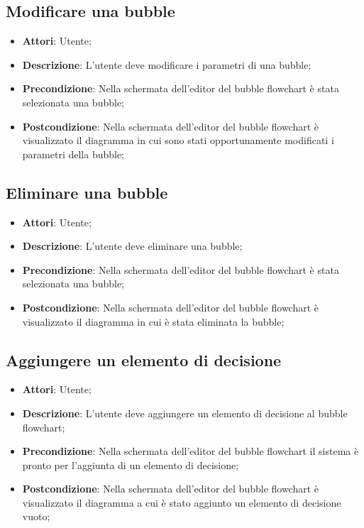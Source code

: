 \documentclass[../AnalisiDeiRequisiti.tex]{subfiles}
\begin{document}
	\subsection{Modificare una bubble}
	\begin{itemize}
		\item \textbf{Attori}: Utente;
		\item \textbf{Descrizione}: L'utente deve modificare i parametri di una bubble;
		\item \textbf{Precondizione}: Nella schermata dell'editor del bubble flowchart è stata selezionata una bubble;
		\item \textbf{Postcondizione}: Nella schermata dell'editor del bubble flowchart è visualizzato il diagramma in cui sono stati opportunamente modificati i parametri della bubble;
	\end{itemize}
	
	\subsection{Eliminare una bubble}
	\begin{itemize}
		\item \textbf{Attori}: Utente;
		\item \textbf{Descrizione}: L'utente deve eliminare una bubble;
		\item \textbf{Precondizione}: Nella schermata dell'editor del bubble flowchart è stata selezionata una bubble;
		\item \textbf{Postcondizione}: Nella schermata dell'editor del bubble flowchart è visualizzato il diagramma in cui è stata eliminata la bubble;
	\end{itemize}
	
	\subsection{Aggiungere un elemento di decisione}
	\begin{itemize}
		\item \textbf{Attori}: Utente;
		\item \textbf{Descrizione}: L'utente deve aggiungere un elemento di decisione al bubble flowchart;
		\item \textbf{Precondizione}: Nella schermata dell'editor del bubble flowchart il sistema è pronto per l'aggiunta di un elemento di decisione;
		\item \textbf{Postcondizione}: Nella schermata dell'editor del bubble flowchart è visualizzato il diagramma a cui è stato aggiunto un elemento di decisione vuoto;
	\end{itemize}
	
\end{document}
